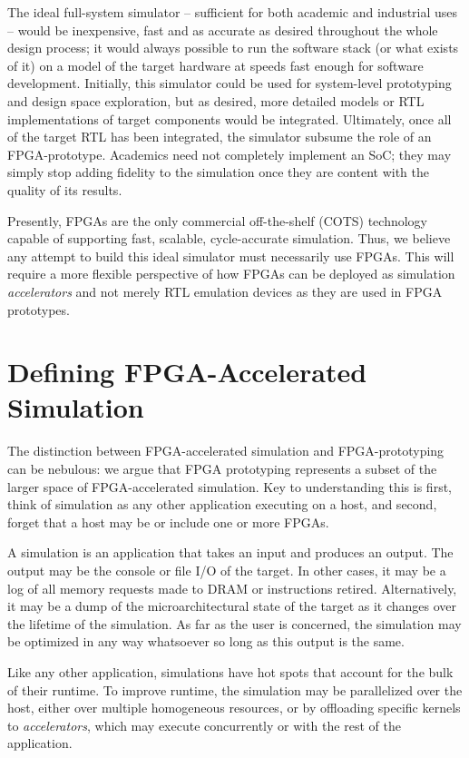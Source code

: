 The ideal full-system simulator -- sufficient for both academic and industrial
uses -- would be inexpensive, fast and as accurate as desired throughout the
whole design process; it would always possible to run the software stack (or
what exists of it) on a model of the target hardware at speeds fast enough for
software development. Initially, this simulator could be used for system-level
prototyping and design space exploration, but as desired, more detailed models
or RTL implementations of target components would be integrated. Ultimately,
once all of the target RTL has been integrated, the simulator subsume the role of an
FPGA-prototype. Academics need not completely implement an SoC; they may simply
stop adding fidelity to the simulation once they are content with the quality
of its results.

Presently, FPGAs are the only commercial off-the-shelf (COTS) technology
capable of supporting fast, scalable, cycle-accurate simulation. Thus, we
believe any attempt to build this ideal simulator must necessarily use FPGAs.
This will require a more flexible perspective of how FPGAs can be deployed as
simulation \emph{accelerators} and not merely RTL emulation devices as they are
used in FPGA prototypes.

\section{Defining FPGA-Accelerated Simulation}

The distinction between FPGA-accelerated simulation and FPGA-prototyping can be
nebulous: we argue that FPGA prototyping represents a subset of the larger
space of FPGA-accelerated simulation. Key to understanding this is first, think of
simulation as any other application executing on a host, and second, forget
that a host may be or include one or more FPGAs.

A simulation is an application that takes an input and produces an output.  The
output may be the console or file I/O of the target. In other cases, it
may be a log of all memory requests made to DRAM or instructions retired.
Alternatively, it may be a dump of the microarchitectural state of the target as it changes over the
lifetime of the simulation.  As far as the user is concerned, the simulation
may be optimized in any way whatsoever so long as this output is the same.

Like any other application, simulations have hot spots that account for the bulk
of their runtime. To improve runtime, the simulation may be parallelized over
the host, either over multiple homogeneous resources, or by offloading specific
kernels to \emph{accelerators}, which may execute concurrently or with the rest
of the application.

